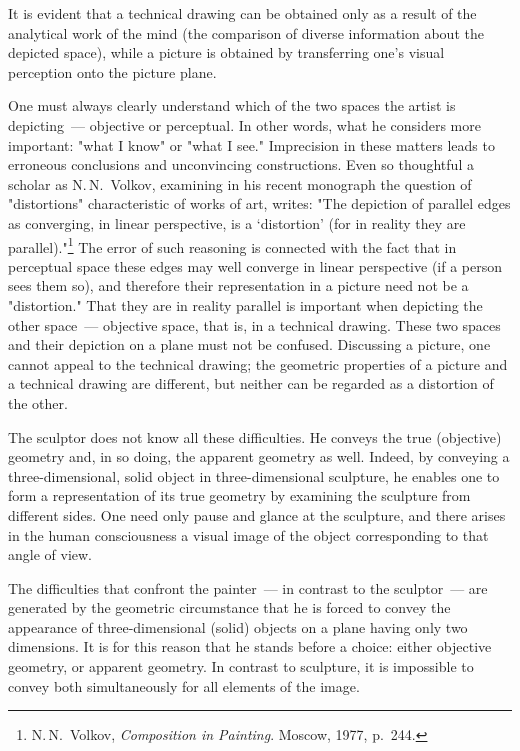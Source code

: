 It is evident that a technical drawing can be obtained only as a result of the analytical
work of the mind (the comparison of diverse information about the depicted space),
while a picture is obtained by transferring one's visual perception onto the picture plane.

One must always clearly understand which of the two spaces the artist is depicting~---
objective or perceptual. In other words, what he considers more important: "what I
know" or "what I see." Imprecision in these matters leads to erroneous conclusions and
unconvincing constructions. Even so thoughtful a scholar as N.\,N.~Volkov, examining
in his recent monograph the question of "distortions" characteristic of works of art,
writes: "The depiction of parallel edges as converging, in linear perspective, is a
`distortion' (for in reality they are parallel)."\footnote{%
  N.\,N.~Volkov, \textit{Composition in Painting}. Moscow, 1977, p.~244.}
The error of such reasoning is connected with the fact that in perceptual space these
edges may well converge in linear perspective (if a person sees them so), and therefore
their representation in a picture need not be a "distortion." That they are in reality
parallel is important when depicting the other space~--- objective space, that is, in a
technical drawing. These two spaces and their depiction on a plane must not be
confused. Discussing a picture, one cannot appeal to the technical drawing; the geometric
properties of a picture and a technical drawing are different, but neither can be regarded
as a distortion of the other.


The sculptor does not know all these difficulties. He conveys the true (objective)
geometry and, in so doing, the apparent geometry as well. Indeed, by conveying a
three-dimensional, solid object in three-dimensional sculpture, he enables one to form a
representation of its true geometry by examining the sculpture from different sides.
One need only pause and glance at the sculpture, and there arises in the human
consciousness a visual image of the object corresponding to that angle of view.

The difficulties that confront the painter~--- in contrast to the sculptor~--- are generated
by the geometric circumstance that he is forced to convey the appearance of
three-dimensional (solid) objects on a plane having only two dimensions. It is for this
reason that he stands before a choice: either objective geometry, or apparent geometry.
In contrast to sculpture, it is impossible to convey both simultaneously for all elements
of the image.

